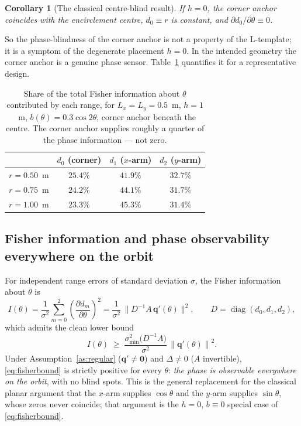 \documentclass[11pt,a4paper]{article}
\newtheorem{corollary}[proposition]{Corollary}
\newcommand{\q}{\bm{q}}
\newcommand{\norm}[1]{\left\lVert#1\right\rVert}
\begin{document}
\begin{corollary}[The classical centre-blind result]
If $h=0$, the corner anchor coincides with the encirclement centre,
$d_0 \equiv r$ is constant, and $\partial d_0/\partial\theta \equiv 0$.
\end{corollary}

So the phase-blindness of the corner anchor is not a property of the L-template;
it is a symptom of the degenerate placement $h=0$. In the intended geometry the
corner anchor is a genuine phase sensor. Table~\ref{tab:infoshare} quantifies
it for a representative design.

\begin{table}[htbp]
\centering
\caption{Share of the total Fisher information about $\theta$ contributed by
each range, for $L_x=L_y=0.5$~m, $h=1$~m, $b(\theta)=0.3\cos2\theta$, corner
anchor beneath the centre. The corner anchor supplies roughly a quarter of the
phase information --- not zero.}
\label{tab:infoshare}
\begin{tabular}{lccc}
\toprule
& $d_0$ (corner) & $d_1$ ($x$-arm) & $d_2$ ($y$-arm) \\
\midrule
$r=0.50$~m & $25.4\%$ & $41.9\%$ & $32.7\%$ \\
$r=0.75$~m & $24.2\%$ & $44.1\%$ & $31.7\%$ \\
$r=1.00$~m & $23.3\%$ & $45.3\%$ & $31.4\%$ \\
\bottomrule
\end{tabular}
\end{table}

\subsection{Fisher information and phase observability everywhere on the orbit}

For independent range errors of standard deviation $\sigma$, the Fisher
information about $\theta$ is
\begin{equation}
I(\theta) = \frac{1}{\sigma^2}\sum_{m=0}^{2}
\left(\frac{\partial d_m}{\partial\theta}\right)^{\!2}
= \frac{1}{\sigma^2}\,\big\lVert D^{-1}A\,\q'(\theta)\big\rVert^2 ,
\qquad D = \operatorname{diag}(d_0,d_1,d_2),
\label{eq:fisher}
\end{equation}
which admits the clean lower bound
\begin{equation}
I(\theta) \;\ge\; \frac{\sigma_{\min}^2\!\big(D^{-1}A\big)}{\sigma^2}\,
\norm{\q'(\theta)}^2 .
\label{eq:fisherbound}
\end{equation}
Under Assumption~\ref{as:regular} ($\q'\neq\bm0$) and $\Delta\neq 0$
($A$ invertible), \eqref{eq:fisherbound} is strictly positive for every
$\theta$: \emph{the phase is observable everywhere on the orbit}, with no blind
spots. This is the general replacement for the classical planar argument that
the $x$-arm supplies $\cos\theta$ and the $y$-arm supplies $\sin\theta$, whose
zeros never coincide; that argument is the $h=0$, $b\equiv0$ special case of
\eqref{eq:fisherbound}.
\end{document}
